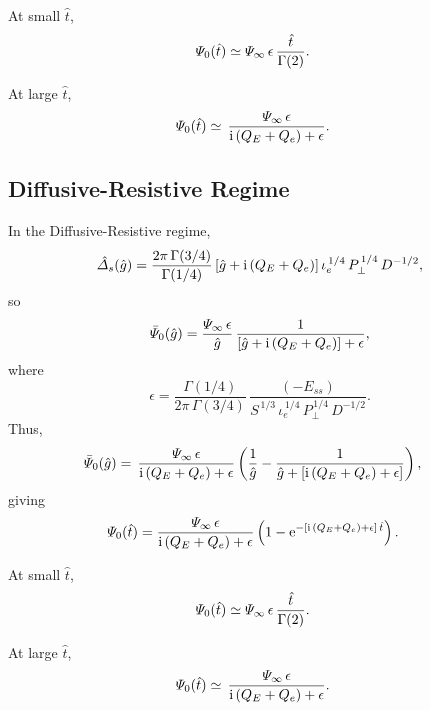 \documentclass[titlepage=false,12pt]{article}
\begin{document}
At small $\hat{t}$,
\begin{align}
{\mit\Psi}_0(\hat{t}) &\simeq {\mit\Psi}_\infty\,\epsilon\,\frac{\hat{t}}{\Gamma(2)}.
\end{align}

At large $\hat{t}$, 
\begin{align}
{\mit\Psi}_0(\hat{t}) &\simeq 
\,\frac{{\mit\Psi}_\infty\,\epsilon}{{\rm i}\,(Q_E+Q_e)+\epsilon}.
\end{align}

\subsection{Diffusive-Resistive Regime}
In the Diffusive-Resistive regime, 
\begin{equation}
\hat{\mit\Delta}_s(\hat{g}) = \frac{2\pi\,\Gamma(3/4)}{\Gamma(1/4)}\,[\hat{g}+ {\rm i}\,(Q_E+Q_e)]\,\iota_e^{\,1/4}\,P_\perp^{\,1/4}\,D^{-1/2},
\end{equation}
so
\begin{equation}
\bar{\mit\Psi}_0(\hat{g}) =\frac{{\mit\Psi}_\infty\,\epsilon}{\hat{g}}\,\frac{1}
{[\hat{g}+ {\rm i}\,(Q_E+Q_e)]+\epsilon},
\end{equation}
where
\begin{equation}
\epsilon = \frac{\Gamma(1/4)}{2\pi\,\Gamma(3/4)}\,\frac{(-E_{ss})}{S^{\,1/3}\,\iota_e^{\,1/4}\,P_\perp^{\,1/4}\,D^{-1/2}}.
\end{equation}
Thus,
\begin{align}
\bar{\mit\Psi}_0(\hat{g}) &=
\,\frac{{\mit\Psi}_\infty\,\epsilon}{{\rm i}\,(Q_E+Q_e)+\epsilon}\left(\frac{1}{\hat{g}} - \frac{1}{\hat{g} + [{\rm i}\,(Q_E+Q_e)+\epsilon]}\right),
\end{align}
giving
\begin{align}
{\mit\Psi}_0(\hat{t}) &=
\frac{{\mit\Psi}_\infty\,\epsilon}{{\rm i}\,(Q_E+Q_e)+\epsilon}\left(1 - {\rm e}^{- [{\rm i}\,(Q_E+Q_e)+\epsilon]\,\hat{t}}\right).
\end{align}

At small $\hat{t}$,
\begin{align}
{\mit\Psi}_0(\hat{t}) &\simeq {\mit\Psi}_\infty\,\epsilon\,\frac{\hat{t}}{\Gamma(2)}.
\end{align}

At large $\hat{t}$, 
\begin{align}
{\mit\Psi}_0(\hat{t}) &\simeq 
\,\frac{{\mit\Psi}_\infty\,\epsilon}{{\rm i}\,(Q_E+Q_e)+\epsilon}.
\end{align}
\end{document}

